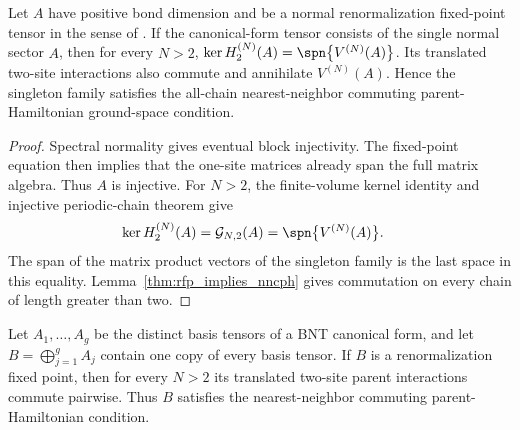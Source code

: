 \begin{lemma}%
    \label{thm:rfp_single_normal_nncph_ground_spaces}
    \leanok
    Let $A$ have positive bond dimension and be a normal renormalization
    fixed-point tensor in the sense of \cite{Cirac2016MPDO_arXiv}. If the
    canonical-form tensor consists of the single normal sector $A$, then for
    every $N>2$,
    $\ker H_2^{(N)}(A) =\spn\bigl\{V^{(N)}(A)\bigr\}$.
    Its translated two-site interactions also commute and annihilate
    $V^{(N)}(A)$. Hence the singleton family satisfies the all-chain
    nearest-neighbor commuting parent-Hamiltonian ground-space condition.
\end{lemma}

\begin{proof}\leanok
    Spectral normality gives eventual block injectivity. The fixed-point
    equation then implies that the one-site matrices already span the full
    matrix algebra. Thus $A$ is injective. For $N>2$, the finite-volume kernel
    identity and injective periodic-chain theorem give
    \begin{align}
        \ker H_2^{(N)}(A)
         & =\mathcal G_{N,2}(A) =\spn\bigl\{V^{(N)}(A)\bigr\}. \notag
    \end{align}
    The span of the matrix product vectors of the singleton family is the last
    space in this equality. Lemma~\ref{thm:rfp_implies_nncph}
    gives commutation on every chain of length greater than two.
\end{proof}

\begin{lemma}%
    \label{thm:rfp_multiplicity_one_bnt_nncph}
    \leanok
    Let $A_1,\ldots,A_g$ be the distinct basis tensors of a BNT canonical
    form, and let $B=\bigoplus_{j=1}^g A_j$ contain one copy of every basis
    tensor. If $B$ is a renormalization fixed point, then for every $N>2$
    its translated two-site parent interactions commute pairwise. Thus $B$
    satisfies the nearest-neighbor commuting parent-Hamiltonian condition.
\end{lemma}

